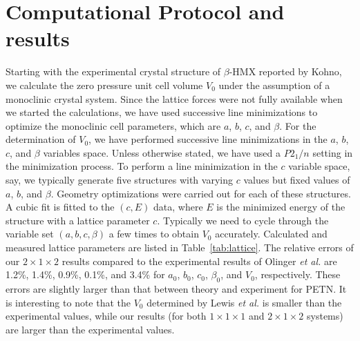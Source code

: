 \commentoutA{\documentclass[prl,aps,twocolumn,twocolumngrid,superbib]{revtex4}}
\begin{document}
\section{Computational Protocol and results}
Starting with the experimental crystal structure of $\beta$-HMX
reported by Kohno\cite{Kohno92}, we calculate the zero pressure unit
cell volume $V_0$ under the assumption of a monoclinic crystal system.
Since the lattice forces were not fully available when we started the
calculations, we have used successive line
minimizations\cite{WPress92} to optimize the monoclinic cell
parameters, which are $a$, $b$, $c$, and $\beta$. For the
determination of $V_0$, we have performed successive line
minimizations in the $a$, $b$, $c$, and $\beta$ variables space.
Unless otherwise stated, we have used a $P2_{1}/n$ setting in the
minimization process.  To perform a line minimization in the $c$
variable space, say, we typically generate five structures with
varying $c$ values but fixed values of $a$, $b$, and $\beta$.
Geometry optimizations were carried out for each of these structures.
A cubic fit is fitted to the $(c, E)$ data, where $E$ is the minimized
energy of the structure with a lattice parameter $c$.  Typically we
need to cycle through the variable set $(a,b,c,\beta)$ a few times to
obtain $V_0$ accurately.  Calculated and measured lattice parameters
are listed in Table~\ref{tab:lattice}.  The relative errors of our
$2\times 1 \times 2$ results compared to the experimental results of
Olinger {\it et al.}\cite{BOlinger78} are 1.2\%, 1.4\%, 0.9\%, 0.1\%,
and 3.4\% for $a_0$, $b_0$, $c_0$, $\beta_0$, and $V_0$, respectively.
These errors are slightly larger than that between theory and
experiment for PETN\cite{CGan04A}. It is interesting to note that the
$V_0$ determined by Lewis {\it et al.}\cite{JPLewis00} is smaller than
the experimental values, while our results (for both $1\times 1 \times
1 $ and $2 \times 1 \times 2$ systems) are larger than the
experimental values.
\end{document}
